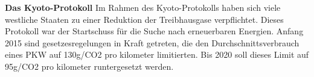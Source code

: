 \textbf{Das Kyoto-Protokoll\nextline}
Im Rahmen des Kyoto-Protokolls haben sich viele westliche Staaten zu einer Reduktion der Treibhausgase verpflichtet. 
Dieses Protokoll war der Startschuss für die Suche nach erneuerbaren Energien. 
Anfang 2015 sind gesetzesregelungen in Kraft getreten, die den Durchschnittsverbrauch eines PKW auf 130g/CO2 pro kilometer  limitierten. 
Bis 2020 soll dieses Limit auf 95g/CO2 pro kilometer runtergesetzt werden.



\clearpage %
